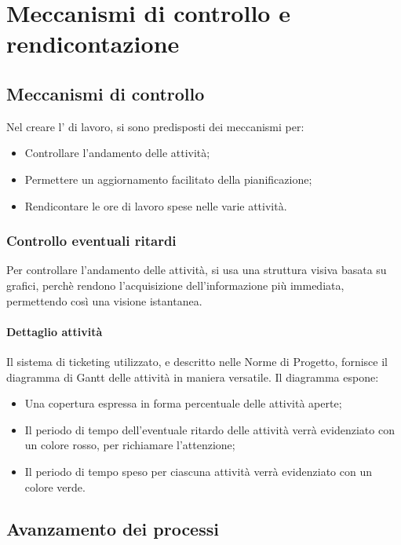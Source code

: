 \newpage


\newpage


\newpage

\section{Meccanismi di controllo e rendicontazione}
\subsection{Meccanismi di controllo}
Nel creare l' di lavoro, si sono predisposti dei meccanismi per:
\begin{itemize}
\item Controllare l'andamento delle attività;
\item Permettere un aggiornamento facilitato della pianificazione;
\item Rendicontare le ore di lavoro spese nelle varie attività.
\end{itemize}
\subsubsection{Controllo eventuali ritardi}
Per controllare l'andamento delle attività, si usa una struttura visiva basata su grafici, perchè rendono l'acquisizione dell'informazione più immediata, permettendo così una visione istantanea.
\paragraph{Dettaglio attività}
Il sistema di ticketing utilizzato, e descritto nelle Norme di Progetto, fornisce il diagramma di Gantt delle attività in maniera versatile. Il diagramma espone:
\begin{itemize}
\item Una copertura espressa in forma percentuale delle attività aperte;
\item Il periodo di tempo dell'eventuale ritardo delle attività verrà evidenziato con un colore rosso, per richiamare l'attenzione;
\item Il periodo di tempo speso per ciascuna attività verrà evidenziato con un colore verde.
\end{itemize}
\subsection{Avanzamento dei processi}
